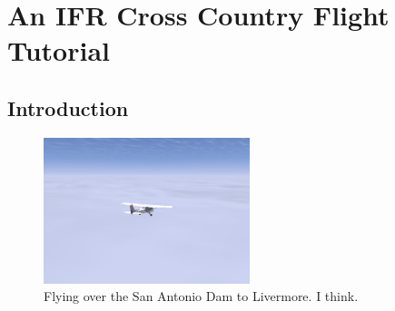 

%
%
%
%
%
%
%





\chapter{An IFR Cross Country Flight Tutorial}\label{IFR Tutorial}

\section{Introduction}

\begin{figure}[h]
  \begin{center}
    \includegraphics[width=6cm]{img/somewhere}
    \caption{Flying over the San Antonio Dam to Livermore.  I think.}
    \label{fig:somewhere}
  \end{center}
\end{figure}

